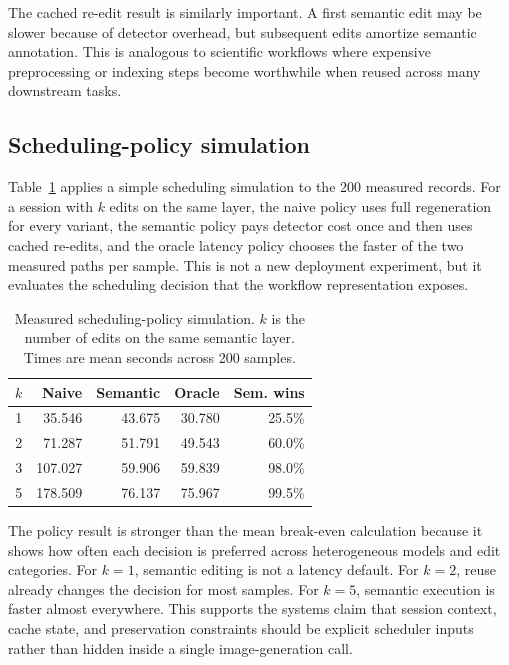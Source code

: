 \documentclass[final,5p,times,number,sort&compress]{elsarticle}
\begin{document}
The cached re-edit result is similarly important. A first semantic edit may be slower because of detector overhead, but subsequent edits amortize semantic annotation. This is analogous to scientific workflows where expensive preprocessing or indexing steps become worthwhile when reused across many downstream tasks.

\subsection{Scheduling-policy simulation}

Table~\ref{tab:policy-sim} applies a simple scheduling simulation to the 200 measured records. For a session with \(k\) edits on the same layer, the naive policy uses full regeneration for every variant, the semantic policy pays detector cost once and then uses cached re-edits, and the oracle latency policy chooses the faster of the two measured paths per sample. This is not a new deployment experiment, but it evaluates the scheduling decision that the workflow representation exposes.

\begin{table}[t]
\centering
\scriptsize
\caption{Measured scheduling-policy simulation. \(k\) is the number of edits on the same semantic layer. Times are mean seconds across 200 samples.}
\label{tab:policy-sim}
\begin{tabular}{rrrrr}
\toprule
\(k\) & Naive & Semantic & Oracle & Sem. wins \\
\midrule
1 & 35.546 & 43.675 & 30.780 & 25.5\% \\
2 & 71.287 & 51.791 & 49.543 & 60.0\% \\
3 & 107.027 & 59.906 & 59.839 & 98.0\% \\
5 & 178.509 & 76.137 & 75.967 & 99.5\% \\
\bottomrule
\end{tabular}
\end{table}

The policy result is stronger than the mean break-even calculation because it shows how often each decision is preferred across heterogeneous models and edit categories. For \(k=1\), semantic editing is not a latency default. For \(k=2\), reuse already changes the decision for most samples. For \(k=5\), semantic execution is faster almost everywhere. This supports the systems claim that session context, cache state, and preservation constraints should be explicit scheduler inputs rather than hidden inside a single image-generation call.
\end{document}
